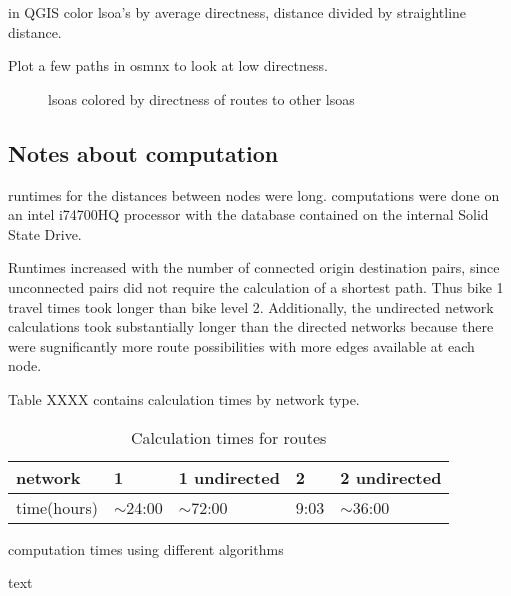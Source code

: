in QGIS color lsoa's by  average directness, distance divided by straightline distance. 

Plot a few paths in osmnx to look at low directness. 


\begin{figure}
\centering
\caption{lsoas colored by directness of routes to other lsoas}
\label{fig:lsoa_directness}
\end{figure}



\subsection{Notes about computation}

runtimes for the distances between nodes were long. computations were done on an intel i74700HQ processor with the database contained on the internal Solid State Drive. 

Runtimes increased with the number of connected origin destination pairs, since unconnected pairs  did not require the calculation of a shortest path. Thus bike 1 travel times took longer than bike level 2. Additionally, the undirected network calculations took substantially longer than the directed networks because there were sugnificantly more route possibilities with more edges available at each node. 

Table XXXX contains calculation times by network type. 



\begin{table}[]
\centering
\begin{tabular}{@{}l|llll@{}}
network     & 1           & 1 undirected & 2    & 2 undirected \\ \hline
time(hours) & $\sim$24:00 & $\sim$72:00  & 9:03 & $\sim$36:00 
\end{tabular}
\caption{Calculation times for routes}
\label{table:net_calc_times}
\end{table}

\begin{table}
\centering
\caption{computation times using different algorithms}
\label{table:comp_times_algo}
\end{table}


text